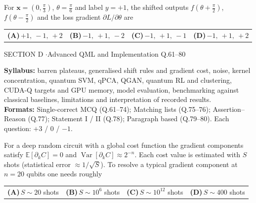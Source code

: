 \documentclass[11pt,a4paper]{article}
\newcommand{\optlabel}[1]{\textbf{(#1)}}
\newenvironment{qitem}[1]{\begin{list}{}{\setlength{\leftmargin}{3.3em}\setlength{\labelwidth}{3.1em}%
  \setlength{\labelsep}{0.2em}\setlength{\topsep}{3pt}\setlength{\parsep}{3pt}}\item[\textbf{Q.#1}\hfill]}{\end{list}}
\newcommand{\qsep}{\par\vspace{2pt}{\color{black!15}\hrule}\vspace{4pt}}
\begin{document}
\begin{qitem}{60}
For $\mathbf x = (0, \frac\pi3)$, $\theta = \frac\pi6$ and label $y = +1$, the shifted outputs $f(\theta + \frac\pi2)$, $f(\theta - \frac\pi2)$ and
the loss gradient $\partial L/\partial\theta$ are
\par\smallskip\noindent\begin{tabularx}{\linewidth}{@{}*{4}{L}@{}}
\optlabel{A}\,$+1,\ -1,\ +2$ & \optlabel{B}\,$-1,\ +1,\ -2$ & \optlabel{C}\,$-1,\ +1,\ -1$ & \optlabel{D}\,$-1,\ +1,\ +2$
\end{tabularx}
\end{qitem}
\qsep

\newpage

\begin{sectionbanner}SECTION D \enspace$\cdot$\enspace Advanced QML and Implementation \hfill Q.61--80\end{sectionbanner}

{\small \textbf{Syllabus:} barren plateaus, generalised shift rules and gradient cost, noise, kernel concentration, quantum SVM, qPCA, QGAN, quantum RL and clustering, CUDA-Q targets and GPU memory, model evaluation, benchmarking against classical baselines, limitations and interpretation of recorded results.\\ \textbf{Formats:} Single-correct MCQ (Q.61--74); Matching lists (Q.75--76); Assertion--Reason (Q.77); Statement I / II (Q.78); Paragraph based (Q.79--80). Each question: $+3$ / $0$ / $-1$.}
\par\medskip

\begin{qitem}{61}
For a deep random circuit with a global cost function the gradient components satisfy $\mathbb E[\partial_kC] = 0$ and
$\operatorname{Var}[\partial_kC] \approx 2^{-n}$. Each cost value is estimated with $S$ shots (statistical error $\approx 1/\sqrt S$). To resolve a
typical gradient component at $n = 20$ qubits one needs roughly
\par\smallskip\noindent\begin{tabularx}{\linewidth}{@{}*{4}{L}@{}}
\optlabel{A}\,$S \sim 20$ shots & \optlabel{B}\,$S \sim 10^{6}$ shots & \optlabel{C}\,$S \sim 10^{12}$ shots & \optlabel{D}\,$S \sim 400$ shots
\end{tabularx}
\end{qitem}
\qsep
\end{document}
